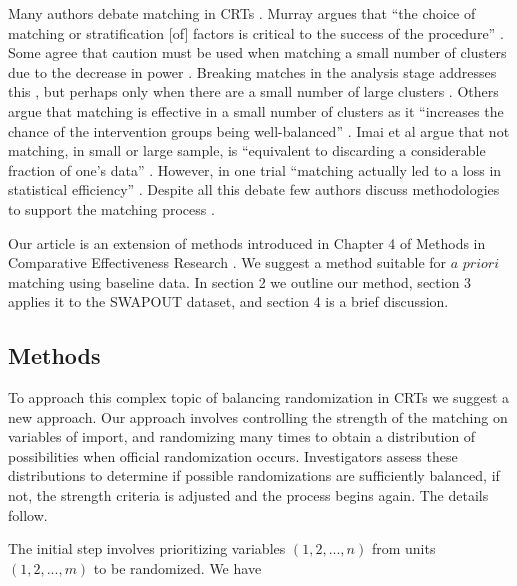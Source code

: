 \documentclass[]{sagej}
\begin{document}
Many authors debate matching in CRTs
\citep{balzer2012match, CRTrials2009, gatsonis2017methods, diehr1995breaking, murray1998design, imai2009essential, PMVsStrat, donner2007merits, klar1997merits, donner2000design, martin1993effect}.
Murray argues that ``the choice of matching or stratification {[}of{]}
factors is critical to the success of the procedure''
\citep{murray1998design}. Some agree that caution must be used when
matching a small number of clusters due to the decrease in power
\citep{donner2000design, klar1997merits, balzer2012match, martin1993effect}.
Breaking matches in the analysis stage addresses this
\citep{diehr1995breaking}, but perhaps only when there are a small
number of large clusters \citep{donner2007merits}. Others argue that
matching is effective in a small number of clusters as it ``increases
the chance of the intervention groups being well-balanced''
\citep{donner2007merits}. Imai et al argue that not matching, in small
or large sample, is ``equivalent to discarding a considerable fraction
of one's data'' \citep{imai2009essential}. However, in one trial
``matching actually led to a loss in statistical efficiency''
\citep[\citet{donner2000design}]{manun1994influence}. Despite all this
debate few authors discuss methodologies to support the matching process
\citep{raab2001balance}.

Our article is an extension of methods introduced in Chapter 4 of
Methods in Comparative Effectiveness Research
\citep{gatsonis2017methods}. We suggest a method suitable for \(a\)
\(priori\) matching using baseline data. In section 2 we outline our
method, section 3 applies it to the SWAPOUT dataset, and section 4 is a
brief discussion.

\subsection{Methods }\label{methods}

To approach this complex topic of balancing randomization in CRTs we
suggest a new approach. Our approach involves controlling the strength
of the matching on variables of import, and randomizing many times to
obtain a distribution of possibilities when official randomization
occurs. Investigators assess these distributions to determine if
possible randomizations are sufficiently balanced, if not, the strength
criteria is adjusted and the process begins again. The details follow.

The initial step involves prioritizing variables \((1, 2,..., n)\) from
units \((1, 2, ..., m)\) to be randomized. We have
\end{document}
